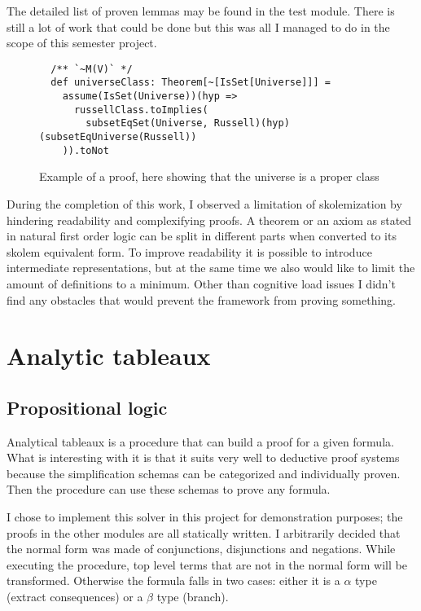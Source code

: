 \documentclass[acmlarge]{acmart}
\begin{document}
The detailed list of proven lemmas may be found in the test module. There is still a lot of work that could be done but this was all I managed to do in the scope of this semester project.

\begin{figure}
\begin{verbatim}
  /** `~M(V)` */
  def universeClass: Theorem[~[IsSet[Universe]]] =
    assume(IsSet(Universe))(hyp =>
      russellClass.toImplies(
        subsetEqSet(Universe, Russell)(hyp)(subsetEqUniverse(Russell))
    )).toNot
\end{verbatim}
\caption{Example of a proof, here showing that the universe is a proper class}
\end{figure}

During the completion of this work, I observed a limitation of skolemization by hindering readability and complexifying proofs. A theorem or an axiom as stated in natural first order logic can be split in different parts when converted to its skolem equivalent form. To improve readability it is possible to introduce intermediate representations, but at the same time we also would like to limit the amount of definitions to a minimum. Other than cognitive load issues I didn't find any obstacles that would prevent the framework from proving something.

\section{Analytic tableaux}

\subsection{Propositional logic}

Analytical tableaux is a procedure that can build a proof for a given formula. What is interesting with it is that it suits very well to deductive proof systems because the simplification schemas can be categorized and individually proven. Then the procedure can use these schemas to prove any formula.

I chose to implement this solver in this project for demonstration purposes; the proofs in the other modules are all statically written. I arbitrarily decided that the normal form was made of conjunctions, disjunctions and negations. While executing the procedure, top level terms that are not in the normal form will be transformed. Otherwise the formula falls in two cases: either it is a $\alpha$ type (extract consequences) or a $\beta$ type (branch).
\end{document}
